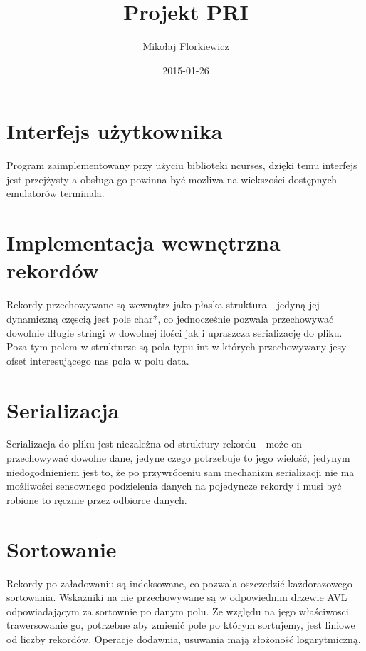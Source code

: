 \documentclass{article}
\title{Projekt PRI}
\author{Mikołaj Florkiewicz}
\date{2015-01-26}
\begin{document}
\maketitle

\section{Interfejs użytkownika}
Program zaimplementowany przy użyciu biblioteki ncurses, dzięki temu 
interfejs jest przejżysty a obsługa go powinna być mozliwa
na wiekszości dostępnych emulatorów terminala.

\section{Implementacja wewnętrzna rekordów}
Rekordy przechowywane są wewnątrz jako płaska struktura - jedyną jej dynamiczną 
częscią jest pole char*, co jednocześnie pozwala przechowywać dowolnie długie 
stringi w dowolnej ilości jak i upraszcza serializację do pliku. 
Poza tym polem w strukturze są pola typu int w których przechowywany jesy ofset 
interesującego nas pola w polu data. 
\section{Serializacja}
Serializacja do pliku jest niezależna od struktury rekordu - może on przechowywać
dowolne dane, jedyne czego potrzebuje to jego wielość, jedynym niedogodnieniem 
jest to, że po przywróceniu sam mechanizm serializacji nie ma możliwości 
sensownego podzielenia danych na pojedyncze rekordy i musi być robione to ręcznie
przez odbiorce danych.
\section{Sortowanie}
Rekordy po załadowaniu są indeksowane, co pozwala oszczedzić każdorazowego sortowania.
Wskażniki na nie przechowywane są w odpowiednim drzewie AVL odpowiadającym 
za sortownie po danym polu. Ze względu na jego właściwosci trawersowanie go, potrzebne
aby zmienić pole po którym sortujemy, jest liniowe od liczby rekordów. Operacje 
dodawnia, usuwania mają złożoność logarytmiczną.
\end{document}
